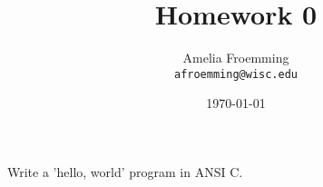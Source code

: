 \documentclass{hwk}
\title{Homework 0}
\author{Amelia Froemming \\\texttt{afroemming@wisc.edu}}
\date{\today}
\begin{document}
    \maketitle
    \makeheader
    
    \begin{Exercise}
        \blindtext
    \end{Exercise}
    \begin{Answer}
        \blindmathpaper
    \end{Answer}
    \begin{Exercise}
        Write a 'hello, world' program in ANSI C.
    \end{Exercise}
    \begin{Answer}
        \inputminted{c}{hello.c}
    \end{Answer}
\end{document}
